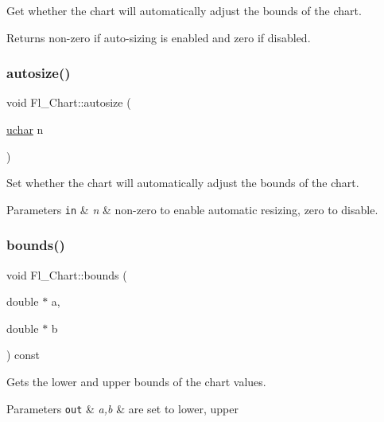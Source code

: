 Get whether the chart will automatically adjust the bounds of the chart. \begin{DoxyReturn}{Returns}
non-\/zero if auto-\/sizing is enabled and zero if disabled. 
\end{DoxyReturn}
\mbox{\label{class_fl___chart_a36cf4d6801b88b3cb27b18d3f86e1835}} 
\subsubsection{\texorpdfstring{autosize()}{autosize()}\hspace{0.1cm}{\footnotesize\ttfamily [2/2]}}
{\footnotesize\ttfamily void Fl\+\_\+\+Chart\+::autosize (\begin{DoxyParamCaption}\item[{\hyperlink{fl__types_8h_a65f85814a8290f9797005d3b28e7e5fc}{uchar}}]{n }\end{DoxyParamCaption})\hspace{0.3cm}{\ttfamily [inline]}}

Set whether the chart will automatically adjust the bounds of the chart. 
\begin{DoxyParams}[1]{Parameters}
\mbox{\tt in}  & {\em n} & non-\/zero to enable automatic resizing, zero to disable. \\
\hline
\end{DoxyParams}
\mbox{\label{class_fl___chart_a6782fd3e36ecec16dcc73e015c66ad8b}} 
\subsubsection{\texorpdfstring{bounds()}{bounds()}\hspace{0.1cm}{\footnotesize\ttfamily [1/2]}}
{\footnotesize\ttfamily void Fl\+\_\+\+Chart\+::bounds (\begin{DoxyParamCaption}\item[{double $\ast$}]{a,  }\item[{double $\ast$}]{b }\end{DoxyParamCaption}) const\hspace{0.3cm}{\ttfamily [inline]}}

Gets the lower and upper bounds of the chart values. 
\begin{DoxyParams}[1]{Parameters}
\mbox{\tt out}  & {\em a,b} & are set to lower, upper \\
\hline
\end{DoxyParams}
\mbox{\label{class_fl___chart_ae1701b8fd93cf1399dc22ef602d9f00d}} 
